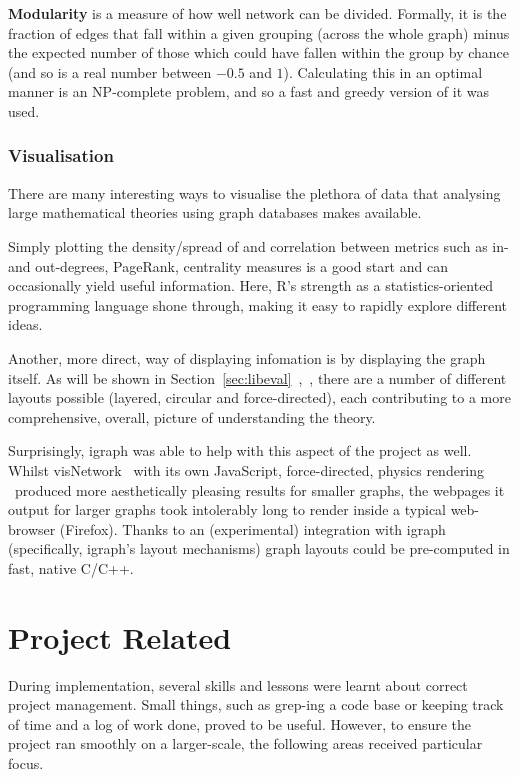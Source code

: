 \textbf{Modularity} is a measure of how well network can be divided.
Formally, it is the fraction of edges that fall within a given grouping
(across the whole graph) minus the expected number of those which could have
fallen within the group by chance (and so is a real number between $-0.5$ and
$1$). Calculating this in an optimal manner is an NP-complete problem, and so
a fast and greedy version of it was used.~\cite{clauset2004}

\subsubsection{Visualisation}

There are many interesting ways to visualise the plethora of data that
analysing large mathematical theories using graph databases makes available.

Simply plotting the density/spread of and correlation between metrics such as
in- and out-degrees, PageRank, centrality measures is a good start and can
occasionally yield useful information. Here, R's strength as a
statistics-oriented programming language shone through, making it easy to
rapidly explore different ideas.

Another, more direct, way of displaying infomation is by displaying the graph
itself. As will be shown in
Section~\ref{sec:libeval}~,~, there
are a number of different layouts possible (layered, circular and
force-directed), each contributing to a more comprehensive, overall, picture of
understanding the theory.

Surprisingly, igraph was able to help with this aspect of the project as well.
Whilst visNetwork \textendash~with its own JavaScript, force-directed, physics
rendering \textendash~produced more aesthetically pleasing results for smaller
graphs, the webpages it output for larger graphs took intolerably long to render
inside a typical web-browser (Firefox). Thanks to an (experimental) integration
with igraph (specifically, igraph's layout mechanisms) graph layouts could be
pre-computed in fast, native C/C++.

\section{Project Related}

During implementation, several skills and lessons were learnt about correct
project management. Small things, such as grep-ing a code base or keeping track of
time and a log of work done, proved to be useful. However, to ensure the
project ran smoothly on a larger-scale, the following areas received particular
focus.

